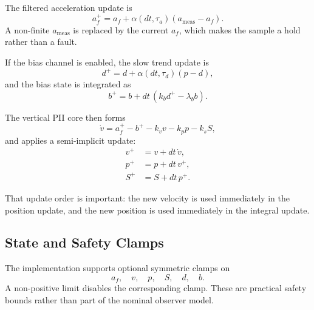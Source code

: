 \documentclass[conference]{IEEEtran}
\begin{document}
    The filtered acceleration update is
    \begin{equation}
        a_f^{+} = a_f + \alpha(dt,\tau_a)(a_{\mathrm{meas}}-a_f).
    \end{equation}
    A non-finite \(a_{\mathrm{meas}}\) is replaced by the current \(a_f\), which
    makes the sample a hold rather than a fault.

    If the bias channel is enabled, the slow trend update is
    \begin{equation}
        d^{+} = d + \alpha(dt,\tau_d)(p-d),
    \end{equation}
    and the bias state is integrated as
    \begin{equation}
        b^{+} = b + dt\,(k_b d^{+} - \lambda_b b).
    \end{equation}

    The vertical PII core then forms
    \begin{equation}
        \dot{v} = a_f^{+} - b^{+} - k_v v - k_p p - k_s S,
    \end{equation}
    and applies a semi-implicit update:
    \begin{align}
        v^{+} &= v + dt\,\dot{v}, \\
        p^{+} &= p + dt\,v^{+}, \\
        S^{+} &= S + dt\,p^{+}.
    \end{align}

    That update order is important: the new velocity is used immediately in the
    position update, and the new position is used immediately in the integral
    update.

    \subsection{State and Safety Clamps}

    The implementation supports optional symmetric clamps on
    \begin{equation}
        a_f,\quad v,\quad p,\quad S,\quad d,\quad b.
    \end{equation}
    A non-positive limit disables the corresponding clamp. These are practical
    safety bounds rather than part of the nominal observer model.
\end{document}
